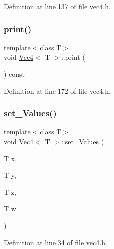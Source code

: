 Definition at line 137 of file vec4.\+h.

\mbox{\label{class_vec4_a9698af7632b2cf25f3f31a3ac88b8c16}} 
\subsubsection{\texorpdfstring{print()}{print()}}
{\footnotesize\ttfamily template$<$class T$>$ \\
void \mbox{\hyperlink{class_vec4}{Vec4}}$<$ T $>$\+::print (\begin{DoxyParamCaption}{ }\end{DoxyParamCaption}) const\hspace{0.3cm}{\ttfamily [inline]}}



Definition at line 172 of file vec4.\+h.

\mbox{\label{class_vec4_a4c670bb938d2274701f7d5764ac68fb8}} 
\subsubsection{\texorpdfstring{set\_Values()}{set\_Values()}}
{\footnotesize\ttfamily template$<$class T$>$ \\
void \mbox{\hyperlink{class_vec4}{Vec4}}$<$ T $>$\+::set\+\_\+\+Values (\begin{DoxyParamCaption}\item[{T}]{x,  }\item[{T}]{y,  }\item[{T}]{z,  }\item[{T}]{w }\end{DoxyParamCaption})\hspace{0.3cm}{\ttfamily [inline]}}



Definition at line 34 of file vec4.\+h.

